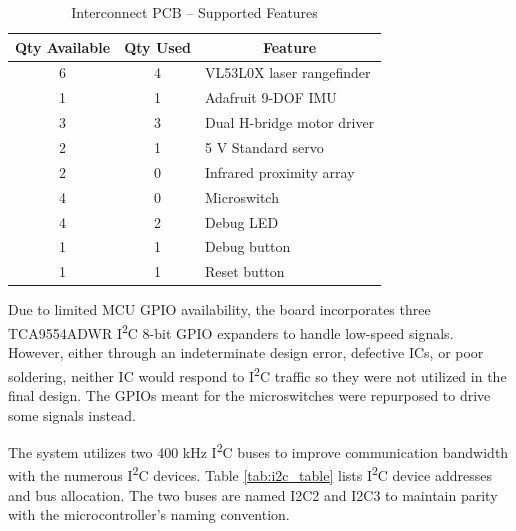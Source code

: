 \begin{table}[h]
	\centering	\caption{Interconnect PCB -- Supported Features}
	\begin{tabular}{ccl}
		\hline 
		Qty Available & Qty Used & \multicolumn{1}{c}{Feature} \\ \hline 
		6 & 4 & VL53L0X laser rangefinder \\ \hline 
		1 & 1 & Adafruit 9-DOF IMU \\ \hline
		3 & 3 & Dual H-bridge motor driver \\ \hline
		2 & 1 & 5 V Standard servo \\ \hline
		2 & 0 & Infrared proximity array \\ \hline
		4 & 0 & Microswitch \\ \hline
		4 & 2 & Debug LED \\ \hline
		1 & 1 & Debug button \\ \hline
		1 & 1 & Reset button \\ \hline
	\end{tabular} 
	\label{tab:interconnect_features}
\end{table}

Due to limited MCU GPIO availability, the board incorporates three TCA9554ADWR I\textsuperscript{2}C 8-bit GPIO expanders to handle low-speed signals. However, either through an indeterminate design error, defective ICs, or poor soldering, neither IC would respond to I\textsuperscript{2}C traffic so they were not utilized in the final design. The GPIOs meant for the microswitches were repurposed to drive some signals instead.

The system utilizes two 400 kHz I\textsuperscript{2}C buses to improve communication bandwidth with the numerous I\textsuperscript{2}C devices. Table \ref{tab:i2c_table} lists I\textsuperscript{2}C device addresses and bus allocation. The two buses are named I2C2 and I2C3 to maintain parity with the microcontroller's naming convention.

